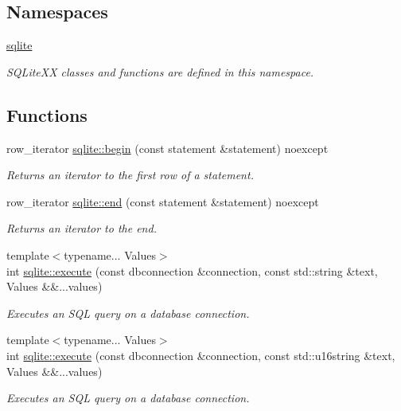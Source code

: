 \subsection*{Namespaces}
\begin{DoxyCompactItemize}
\item 
\hyperlink{a00038}{sqlite}
\begin{DoxyCompactList}\small\item\em S\-Q\-Lite\-X\-X classes and functions are defined in this namespace. \end{DoxyCompactList}\end{DoxyCompactItemize}
\subsection*{Functions}
\begin{DoxyCompactItemize}
\item 
row\-\_\-iterator \hyperlink{a00038_a82c17565b2423a151a79f500e05384c7}{sqlite\-::begin} (const statement \&statement) noexcept
\begin{DoxyCompactList}\small\item\em Returns an iterator to the first row of a statement. \end{DoxyCompactList}\item 
row\-\_\-iterator \hyperlink{a00038_a9bb86a852a764bb601061807c9c53107}{sqlite\-::end} (const statement \&statement) noexcept
\begin{DoxyCompactList}\small\item\em Returns an iterator to the end. \end{DoxyCompactList}\item 
{\footnotesize template$<$typename... Values$>$ }\\int \hyperlink{a00038_ac3634536982adcefd80f2e5b5a8a105d}{sqlite\-::execute} (const dbconnection \&connection, const std\-::string \&text, Values \&\&...values)
\begin{DoxyCompactList}\small\item\em Executes an S\-Q\-L query on a database connection. \end{DoxyCompactList}\item 
{\footnotesize template$<$typename... Values$>$ }\\int \hyperlink{a00038_a5d8cb158ff2ea9cd6331c9ed8dfde8da}{sqlite\-::execute} (const dbconnection \&connection, const std\-::u16string \&text, Values \&\&...values)
\begin{DoxyCompactList}\small\item\em Executes an S\-Q\-L query on a database connection. \end{DoxyCompactList}\end{DoxyCompactItemize}
